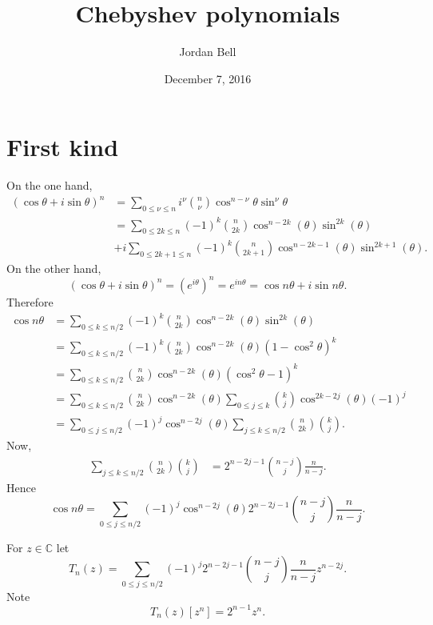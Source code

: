 \documentclass{article}
\theoremstyle{definition}
\theoremstyle{definition}
\begin{document}
\title{Chebyshev polynomials}
\author{Jordan Bell}
\date{December 7, 2016}

\maketitle

\section{First kind}
On the one hand, 
\begin{align*}
(\cos \theta + i \sin \theta)^n&=\sum_{0 \leq \nu \leq n} i^\nu \binom{n}{\nu} \cos^{n-\nu} \theta \sin^\nu \theta\\
&=\sum_{0 \leq 2k \leq n} (-1)^k \binom{n}{2k}\cos^{n-2k}(\theta) \sin^{2k}(\theta)\\
&+i\sum_{0 \leq 2k+1 \leq n}  (-1)^k \binom{n}{2k+1}\cos^{n-2k-1}(\theta) \sin^{2k+1}(\theta).
\end{align*}
On the other hand,
\[
(\cos \theta+i\sin \theta)^n = (e^{i\theta})^n = e^{in\theta} = \cos n\theta + i\sin n\theta.
\]
Therefore
\begin{align*}
\cos n\theta&=\sum_{0 \leq k \leq n/2} (-1)^k \binom{n}{2k}\cos^{n-2k}(\theta) \sin^{2k}(\theta)\\
&=\sum_{0 \leq k \leq n/2} (-1)^k \binom{n}{2k}\cos^{n-2k}(\theta) (1-\cos^2 \theta)^k\\
&=\sum_{0 \leq k \leq n/2} \binom{n}{2k}\cos^{n-2k}(\theta) (\cos^2 \theta-1)^k\\
&=\sum_{0 \leq k \leq n/2} \binom{n}{2k}\cos^{n-2k}(\theta) \sum_{0 \leq j \leq k} \binom{k}{j} \cos^{2k-2j}(\theta)  (-1)^j\\
&=\sum_{0 \leq j \leq n/2} (-1)^j \cos^{n-2j}(\theta) \sum_{j \leq k \leq n/2} \binom{n}{2k} \binom{k}{j}.
\end{align*}
Now,
\begin{align*}
\sum_{j \leq k \leq n/2} \binom{n}{2k} \binom{k}{j}&=
2^{n-2j-1} \binom{n-j}{j} \frac{n}{n-j}.
\end{align*}
Hence
\[
\cos n\theta = \sum_{0 \leq j \leq n/2} (-1)^j \cos^{n-2j}(\theta)2^{n-2j-1} \binom{n-j}{j} \frac{n}{n-j}.
\]

For $z \in \mathbb{C}$ let 
\begin{equation}
T_n(z) =  \sum_{0 \leq j \leq n/2} (-1)^j 2^{n-2j-1} \binom{n-j}{j} \frac{n}{n-j} z^{n-2j}.
\label{Tn}
\end{equation}
Note
\[
T_n(z)[z^n] = 2^{n-1} z^n.
\]
\end{document}
